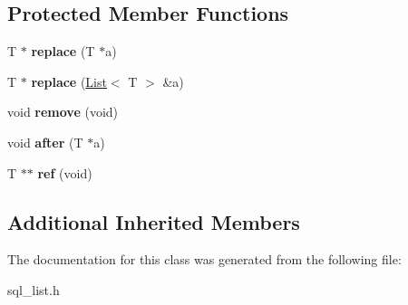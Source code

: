 \subsection*{Protected Member Functions}
\begin{DoxyCompactItemize}
\item 
\mbox{\label{classList__iterator__fast_a65f09fba91f762edef5648d3af43430f}} 
T $\ast$ {\bfseries replace} (T $\ast$a)
\item 
\mbox{\label{classList__iterator__fast_a09854dd8d2291785c5c281f338e30512}} 
T $\ast$ {\bfseries replace} (\mbox{\hyperlink{classList}{List}}$<$ T $>$ \&a)
\item 
\mbox{\label{classList__iterator__fast_a305f71c3c1f5e2d3dbeab0c9709f62f8}} 
void {\bfseries remove} (void)
\item 
\mbox{\label{classList__iterator__fast_a0d7253dbae7d963f31a496dc1b129f64}} 
void {\bfseries after} (T $\ast$a)
\item 
\mbox{\label{classList__iterator__fast_a997bf0db44f20c867cdda4648dccfcdd}} 
T $\ast$$\ast$ {\bfseries ref} (void)
\end{DoxyCompactItemize}
\subsection*{Additional Inherited Members}


The documentation for this class was generated from the following file\+:\begin{DoxyCompactItemize}
\item 
sql\+\_\+list.\+h\end{DoxyCompactItemize}
